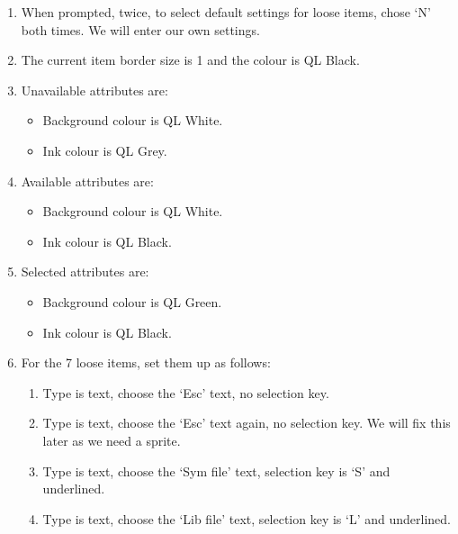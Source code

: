 \begin{enumerate}
{\begin{itemize}[itemsep=0pt]
\end{itemize}
}
\item{When prompted, twice, to select default settings for loose
        items, chose `N' both times. We will enter our own settings.
}
\item{The current item border size is 1 and the colour is QL
        Black.
}
\item{Unavailable attributes are:
\begin{itemize}[itemsep=0pt]

\item{}Background colour is QL White.


\item{}Ink colour is QL Grey.

\end{itemize}
}
\item{Available attributes are:
\begin{itemize}[itemsep=0pt]

\item{}Background colour is QL White.


\item{}Ink colour is QL Black.

\end{itemize}
}
\item{Selected attributes are:
\begin{itemize}[itemsep=0pt]

\item{}Background colour is QL Green.


\item{}Ink colour is QL Black.

\end{itemize}
}
\item{For the 7 loose items, set them up as follows:
\begin{enumerate}[itemsep=0pt]

\item{}Type is text, choose the `Esc' text, no selection
            key.


\item{}Type is text, choose the `Esc' text again, no selection key.
            We will fix this later as we need a sprite.


\item{}Type is text, choose the `Sym file' text, selection key is
            `S' and underlined.


\item{}Type is text, choose the `Lib file' text, selection key is
            `L' and underlined.



\end{enumerate}}
\end{enumerate}
